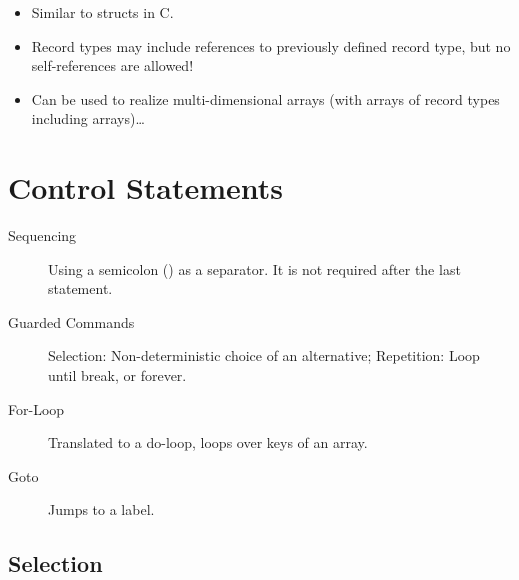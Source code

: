 			\begin{itemize}
				\item Similar to structs in C.
				\item Record types may include references to previously defined record type, but no self-references are allowed!
				\item Can be used to realize multi-dimensional arrays (with arrays of record types including arrays)\dots
			\end{itemize}

	\section{Control Statements}
		\begin{description}
			\item[Sequencing] Using a semicolon (\inlinePromela{;}) as a separator. It is not required after the last statement.
			\item[Guarded Commands] Selection: Non-deterministic choice of an alternative; Repetition: Loop until break, or forever.
			\item[For-Loop] Translated to a do-loop, loops over keys of an array.
			\item[Goto] Jumps to a label.
		\end{description}

		\subsection{Selection}
			
			
